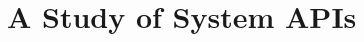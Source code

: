 \chapter{A Study of System APIs}
\label{chap:study}


\makeatletter
{}
\makeatother
\graphicspath{{study/figures/}}





%




\makeatletter
{}
\makeatother
\graphicspath{{}}
